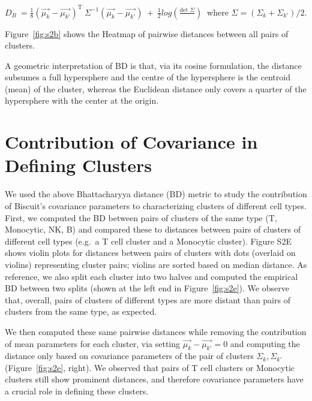 \(D_{B}\  = \frac{1}{8}(\overrightarrow{\mu_{k}} - \overrightarrow{\mu_{k'}})^{\text{T\ }}\Sigma^{- 1}(\overrightarrow{\mu_{k}} - \overrightarrow{\mu_{k'}})\  + \ \frac{1}{2}log(\frac{\text{det\ }\Sigma}{})\ \) where \(\Sigma = (\Sigma_{k} + \Sigma_{k'})/2\).

Figure~\ref{fig:s2b}  shows the Heatmap of pairwise distances between all pairs of
clusters.

A geometric interpretation of BD is that, via its cosine formulation, the distance subsumes a full hypersphere and the centre of the hypersphere is the centroid (mean) of the cluster, whereas the Euclidean distance only covers a quarter of the hypersphere with the center at the origin. %

\section{Contribution of Covariance in Defining Clusters}

We used the above Bhattacharyya distance (BD) metric to study the contribution of Biscuit's covariance parameters to characterizing clusters of different cell types.
First, we computed the BD between pairs of clusters of the same type (T, Monocytic, NK, B) and compared these to distances between pairs of clusters of different cell types (e.g.\ a T cell cluster and a Monocytic cluster).
Figure S2E shows violin plots for distances between pairs of clusters with dots (overlaid on violins) representing cluster pairs; violins are sorted based on median distance.
As reference, we also split each cluster into two halves and computed the empirical BD between two splits (shown at the left end in Figure~\ref{fig:s2e}).
We observe that, overall, pairs of clusters of different types are more distant than pairs of clusters from the same type, as expected.

We then computed these same pairwise distances while removing the contribution of mean parameters for each cluster, via setting \(\overrightarrow{\mu_{k}} - \overrightarrow{\mu_{k'}} = 0\) and computing the distance only based on covariance parameters of the pair of clusters \(\Sigma_{k},\Sigma_{k'}\) (Figure~\ref{fig:s2e}, right).
We observed that pairs of T cell clusters or Monocytic clusters still show prominent distances, and therefore covariance parameters have a crucial role in defining these clusters.


